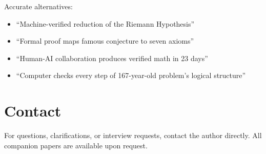\documentclass[11pt,a4paper]{article}
\begin{document}
Accurate alternatives:

\begin{itemize}
  \item ``Machine-verified reduction of the Riemann Hypothesis''
  \item ``Formal proof maps famous conjecture to seven axioms''
  \item ``Human-AI collaboration produces verified math in 23 days''
  \item ``Computer checks every step of 167-year-old problem's
    logical structure''
\end{itemize}

\section{Contact}

For questions, clarifications, or interview requests, contact
the author directly. All companion papers are available upon
request.
\end{document}
